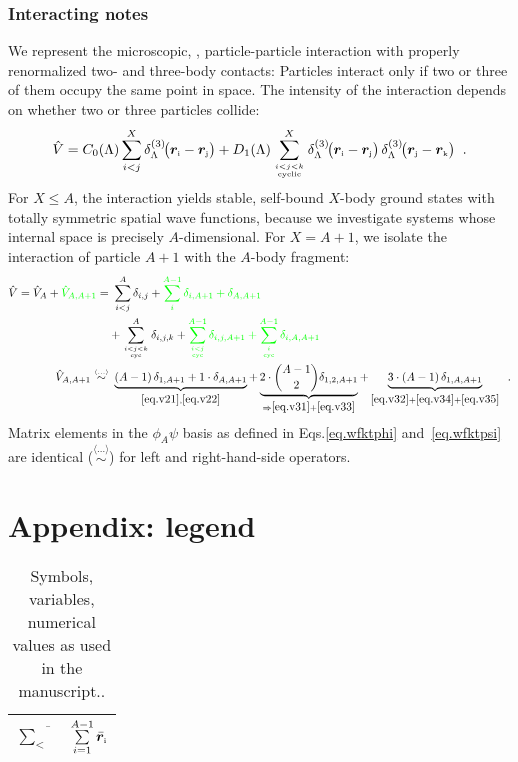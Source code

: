 \documentclass[aps,prd,onecolumn
,tightenlines,letterpaper,
notitlepage,11pt,linenumbers,
nofootinbib]{revtex4-1}
\begin{document}
\subsubsection{Interacting notes}
We represent the microscopic, \ie, particle-particle interaction with properly
renormalized two- and three-body contacts: Particles interact only if two or three
of them occupy the same point in space. The intensity of the interaction depends
on whether two or three particles collide:
\[
\hat{V}=C_0(\Lambda)\sum_{i<j}^X\ddrei{\vsp{i}-\vsp{j}}+
D_1(\Lambda)\sum^X_{i<j<k\atop\text{\tiny cyclic}}\ddrei{\vsp{i}-\vsp{j}}\,
\ddrei{\vsp{j}-\vsp{k}}\;\;.
\la{eq.int}\]
For $X\leq A$, the interaction yields stable, self-bound $X$-body ground states with
totally symmetric spatial wave functions, because we investigate systems whose
internal space is precisely $A$-dimensional.
For $X=A+1$, we isolate the interaction of particle $A+1$ with the $A$-body fragment:
\begin{align*}
\hat{V}=\hat{V}_A+\green{\hat{V}_{A,A+1}}=&~
\sum_{i<j}^A\delta_{i,j}+\green{\sum_{i}^{A-1}\delta_{i,A+1}+\delta_{A,A+1}}\\
&+\sum_{i<j<k\atop\text{\tiny cyc}}^A\delta_{i,j,k}+\green{\sum_{i<j\atop\text{\tiny cyc}}^{A-1}\delta_{i,j,A+1}+\sum_{i\atop\text{\tiny cyc}}^{A-1}\delta_{i,A,A+1}}\\
\hat{V}_{A,A+1}\stackrel{\scriptscriptstyle \langle\ldots\rangle}{\sim}&~
\underbrace{(A-1)\,\delta_{1,A+1}+1\cdot\delta_{A,A+1}}_{\eqref{eq.v21},\eqref{eq.v22}}+\underbrace{2\cdot{A-1\choose 2}
\delta_{1,2,A+1}}_{\Rightarrow\eqref{eq.v31}+\eqref{eq.v33}}+\underbrace{3\cdot(A-1)\,\delta_{1,A,A+1}}_{\eqref{eq.v32}+\eqref{eq.v34}+\eqref{eq.v35}}\;\;.
\la{eq.clint}\end{align*}
Matrix elements in the $\phi_A\psi$ basis as defined in Eqs.\eqref{eq.wfktphi}
and~\eqref{eq.wfktpsi} are identical
($\stackrel{\scriptscriptstyle \langle\ldots\rangle}{\sim}$) for left and right-hand-side
operators.
\newpage
\section*{Appendix: legend}
\begin{table}
\setlength{\tabcolsep}{4pt}
\renewcommand{\arraystretch}{1.4}
\caption{\label{tab.legend}{Symbols, variables, numerical values as used in the manuscript..}}
\small\centering
\begin{tabular}{l|l}
\hline\hline\rowcolor{white}
$\overline{\sum\limits_<}$ & $\sum\limits_{i=1}^{A-1}\bar{\boldsymbol{r}}_\text{\tiny i}$ \\
\hline
\end{tabular}
\end{table}


\newpage


\end{document}
